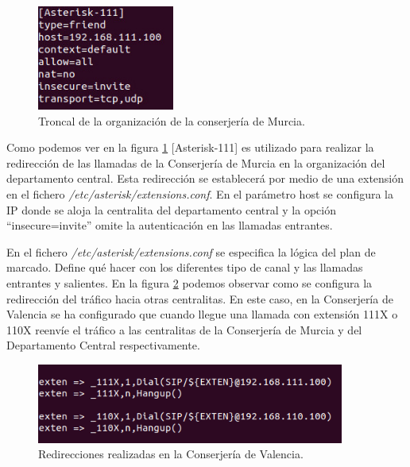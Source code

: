 \documentclass[a4paper]{article}
\begin{document}
\begin{figure}[htb]
    \begin{center}
        \includegraphics[width=0.4\textwidth]{asterisk-111.jpg}
         \caption{Troncal de la organización de la conserjería de Murcia.}
          \label{fig:a-111}
    \end{center}
\end{figure}

 Como podemos ver en la figura \ref{fig:a-111} [Asterisk-111] es utilizado para realizar la redirección de las llamadas de la Conserjería de Murcia en la organización del departamento central. Esta redirección se establecerá por medio de una extensión en el fichero \textit{/etc/asterisk/extensions.conf}. En el parámetro host se configura la IP donde se aloja la centralita del departamento central y la opción ``insecure=invite'' omite la autenticación en las llamadas entrantes.


 En el fichero \textit{/etc/asterisk/extensions.conf} se especifica   la   lógica   del   plan   de marcado. Define qué hacer con los diferentes tipo de canal y las llamadas entrantes y salientes. En la figura \ref{fig:troncales} podemos observar como se configura la redirección del tráfico hacia otras centralitas. En este caso, en la Conserjería de Valencia se ha configurado que cuando llegue una llamada con extensión 111X o 110X reenvíe el tráfico a las centralitas de la Conserjería de Murcia y del Departamento Central respectivamente.

\begin{figure}[htb]
    \begin{center}
        \includegraphics[width=0.9\textwidth]{troncales.png}
         \caption{Redirecciones realizadas en la Conserjería de Valencia.}
         \label{fig:troncales}
    \end{center}

\end{figure}
\end{document}
